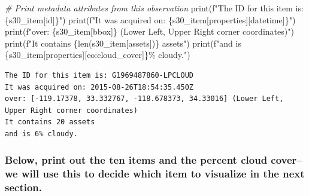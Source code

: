 \documentclass[
  letterpaper,
]{scrartcl}
\newenvironment{Shaded}{}{}
\newcommand{\BuiltInTok}[1]{#1}
\newcommand{\CommentTok}[1]{\textcolor[rgb]{0.38,0.63,0.69}{\textit{#1}}}
\newcommand{\NormalTok}[1]{#1}
\newcommand{\SpecialCharTok}[1]{\textcolor[rgb]{0.25,0.44,0.63}{#1}}
\newcommand{\SpecialStringTok}[1]{\textcolor[rgb]{0.73,0.40,0.53}{#1}}
\newcommand{\StringTok}[1]{\textcolor[rgb]{0.25,0.44,0.63}{#1}}
\begin{document}
\begin{Shaded}
\begin{Highlighting}[]
\CommentTok{\# Print metadata attributes from this observation}
\BuiltInTok{print}\NormalTok{(}\SpecialStringTok{f"The ID for this item is: }\SpecialCharTok{\{}\NormalTok{s30\_item[}\StringTok{\textquotesingle{}id\textquotesingle{}}\NormalTok{]}\SpecialCharTok{\}}\SpecialStringTok{"}\NormalTok{)}
\BuiltInTok{print}\NormalTok{(}\SpecialStringTok{f"It was acquired on: }\SpecialCharTok{\{}\NormalTok{s30\_item[}\StringTok{\textquotesingle{}properties\textquotesingle{}}\NormalTok{][}\StringTok{\textquotesingle{}datetime\textquotesingle{}}\NormalTok{]}\SpecialCharTok{\}}\SpecialStringTok{"}\NormalTok{)}
\BuiltInTok{print}\NormalTok{(}\SpecialStringTok{f"over: }\SpecialCharTok{\{}\NormalTok{s30\_item[}\StringTok{\textquotesingle{}bbox\textquotesingle{}}\NormalTok{]}\SpecialCharTok{\}}\SpecialStringTok{ (Lower Left, Upper Right corner coordinates)"}\NormalTok{)}
\BuiltInTok{print}\NormalTok{(}\SpecialStringTok{f"It contains }\SpecialCharTok{\{}\BuiltInTok{len}\NormalTok{(s30\_item[}\StringTok{\textquotesingle{}assets\textquotesingle{}}\NormalTok{])}\SpecialCharTok{\}}\SpecialStringTok{ assets"}\NormalTok{)}
\BuiltInTok{print}\NormalTok{(}\SpecialStringTok{f"and is }\SpecialCharTok{\{}\NormalTok{s30\_item[}\StringTok{\textquotesingle{}properties\textquotesingle{}}\NormalTok{][}\StringTok{\textquotesingle{}eo:cloud\_cover\textquotesingle{}}\NormalTok{]}\SpecialCharTok{\}}\SpecialStringTok{\% cloudy."}\NormalTok{)}
\end{Highlighting}
\end{Shaded}

\begin{verbatim}
The ID for this item is: G1969487860-LPCLOUD
It was acquired on: 2015-08-26T18:54:35.450Z
over: [-119.17378, 33.332767, -118.678373, 34.33016] (Lower Left, Upper Right corner coordinates)
It contains 20 assets
and is 6% cloudy.
\end{verbatim}

\hypertarget{below-print-out-the-ten-items-and-the-percent-cloud-coverwe-will-use-this-to-decide-which-item-to-visualize-in-the-next-section.}{%
\subsubsection{Below, print out the ten items and the percent cloud
cover--we will use this to decide which item to visualize in the next
section.}\label{below-print-out-the-ten-items-and-the-percent-cloud-coverwe-will-use-this-to-decide-which-item-to-visualize-in-the-next-section.}}
\end{document}
